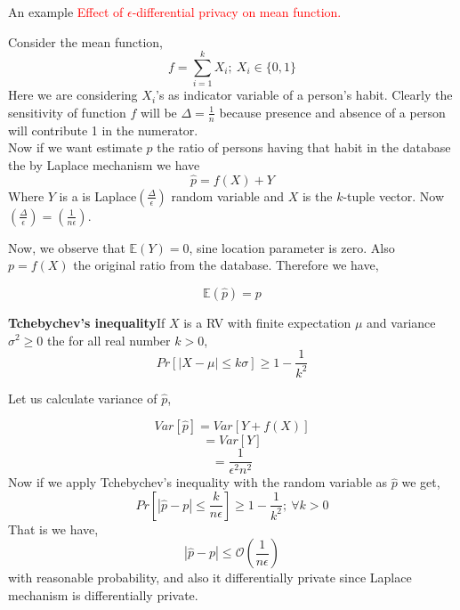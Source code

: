 \documentclass[aspectratio=169]{beamer}
\newcommand{\tcr}{\textcolor{red}}
\begin{document}
\begin{frame}[allowframebreaks]{An example}
\tcr{Effect of $\epsilon$-differential privacy on mean function.}

Consider the mean function,
$$f=\sum_{i=1}^{k} X_i; \: X_i \in \{0,1\}$$
Here we are considering $X_i$'s as indicator variable of a person's habit. Clearly the sensitivity of function $f$ will be $\Delta=\frac{1}{n}$ because presence and absence of a person will contribute 1 in the numerator.\\
Now if we want estimate $p$ the ratio of persons having that habit in the database the by Laplace mechanism we have
$$\hat{p}=f(X) + Y$$
Where $Y$ is a is Laplace$(\frac{\Delta}{\epsilon})$ random variable and $X$ is the $k$-tuple vector. Now $(\frac{\Delta}{\epsilon}) = (\frac{1}{n\epsilon})$.

Now, we observe that $\mathbb{E}(Y)=0$, sine location parameter is zero. Also $p=f(X)$ the original ratio from the database. Therefore we have,

$$\mathbb{E}(\hat{p}) = p$$

\begin{definition}
\textbf{Tchebychev's inequality}If $X$ is a RV with finite expectation $\mu$ and variance $\sigma^2 \geq 0$ the for all real number $k > 0$,
$$Pr[|X- \mu| \leq k\sigma] \geq 1 - \frac{1}{k^2}$$
\end{definition}

Let us calculate variance of $\hat{p}$,

$$Var[\hat{p}]= Var[Y + f(X)]$$
$$=Var[Y] $$
$$=\frac{1}{\epsilon^2 n^2}$$
Now if we apply Tchebychev's inequality with the random variable as $\hat{p}$ we get,
$$Pr[|\hat{p}- p| \leq \frac{k}{n\epsilon}] \geq 1 - \frac{1}{k^2};\: \forall k > 0$$
That is we have,
$$|\hat{p}- p| \leq \mathcal{O}(\frac{1}{n\epsilon})$$
with reasonable probability, and also it differentially private since Laplace mechanism is differentially  private.
\end{frame}
\end{document}
